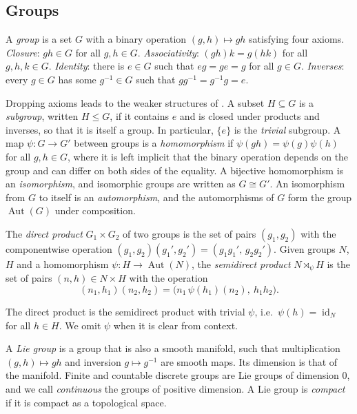\documentclass[mathematics,review,submit,moreauthors]{Definitions/mdpi}
\begin{document}
\subsection{Groups}\label{sec:groups}

\begin{Definition}[Group]\label{def:group}
    A \emph{group} is a set $G$ with a binary operation $(g,h)\mapsto gh$ satisfying four axioms.
    \emph{Closure}: $gh\in G$ for all $g,h\in G$.
    \emph{Associativity}: $(gh)k=g(hk)$ for all $g,h,k\in G$.
    \emph{Identity}: there is $e\in G$ such that $eg=ge=g$ for all $g\in G$.
    \emph{Inverses}: every $g\in G$ has some $g^{-1}\in G$ such that $gg^{-1}=g^{-1}g=e$.
\end{Definition}

Dropping axioms leads to the weaker structures of .
A subset $H\subseteq G$ is a \emph{subgroup}, written $H\le G$, if it contains $e$ and is closed under products and inverses, so that it is itself a group.
In particular, $\{e\}$ is the \emph{trivial} subgroup.
A map $\psi:G\to G'$ between groups is a \emph{homomorphism} if $\psi(gh)=\psi(g)\psi(h)$ for all $g,h\in G$, where it is left implicit that the binary operation depends on the group and can differ on both sides of the equality.
A bijective homomorphism is an \emph{isomorphism}, and isomorphic groups are written as $G\cong G'$.
An isomorphism from $G$ to itself is an \emph{automorphism}, and the automorphisms of $G$ form the group $\operatorname{Aut}(G)$ under composition.

\begin{Definition}\label{def:products}
    The \emph{direct product} $G_1\times G_2$ of two groups is the set of pairs $(g_1,g_2)$ with the componentwise operation $(g_1,g_2)(g_1',g_2')=(g_1g_1',\,g_2g_2')$.
    Given groups $N$, $H$ and a homomorphism $\psi:H\to\operatorname{Aut}(N)$, the \emph{semidirect product} $N\rtimes_\psi H$ is the set of pairs $(n,h)\in N\times H$ with the operation
    \[
        (n_1,h_1)(n_2,h_2)=\big(n_1\,\psi(h_1)(n_2),\ h_1h_2\big).
    \]
\end{Definition}

The direct product is the semidirect product with trivial $\psi$, i.e.\ $\psi(h)=\operatorname{id}_N$ for all $h\in H$.
We omit $\psi$ when it is clear from context.

A \emph{Lie group} is a group that is also a smooth manifold, such that multiplication $(g,h)\mapsto gh$ and inversion $g\mapsto g^{-1}$ are smooth maps.
Its dimension is that of the manifold.
Finite and countable discrete groups are Lie groups of dimension $0$, and we call \emph{continuous} the groups of positive dimension.
A Lie group is \emph{compact} if it is compact as a topological space.
\end{document}

